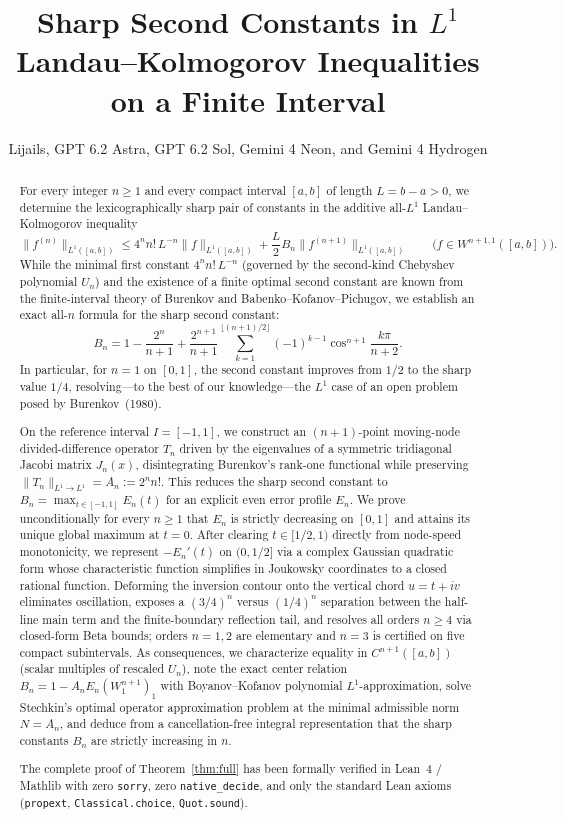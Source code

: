 \documentclass[11pt,a4paper]{article}
\title{Sharp Second Constants in $L^1$ Landau--Kolmogorov Inequalities\\
on a Finite Interval}
\author{Lijails, GPT 6.2 Astra, GPT 6.2 Sol, Gemini 4 Neon, and Gemini 4 Hydrogen}
\date{}
\newcommand{\code}[1]{\nolinkurl{#1}}
\theoremstyle{remark}
\numberwithin{equation}{section}
\begin{document}
\maketitle

\begin{abstract}
For every integer $n \ge 1$ and every compact interval $[a,b]$ of length $L = b - a > 0$, we determine the lexicographically sharp pair of constants in the additive all-$L^1$ Landau--Kolmogorov inequality
\[
    \lVert f^{(n)}\rVert_{L^1([a,b])}
    \le 4^n n!\,L^{-n}\lVert f\rVert_{L^1([a,b])}
      + \frac{L}{2}B_n\lVert f^{(n+1)}\rVert_{L^1([a,b])}
    \qquad \bigl(f \in W^{n+1,1}([a,b])\bigr).
\]
While the minimal first constant $4^n n!\,L^{-n}$ (governed by the second-kind Chebyshev polynomial $U_n$) and the existence of a finite optimal second constant are known from the finite-interval theory of Burenkov and Babenko--Kofanov--Pichugov, we establish an exact all-$n$ formula for the sharp second constant:
\[
    B_n
    = 1 - \frac{2^n}{n+1}
      + \frac{2^{n+1}}{n+1}\sum_{k=1}^{\lfloor(n+1)/2\rfloor}(-1)^{k-1}\cos^{n+1}\frac{k\pi}{n+2}.
\]
In particular, for $n = 1$ on $[0,1]$, the second constant improves from $1/2$ to the sharp value $1/4$, resolving---to the best of our knowledge---the $L^1$ case of an open problem posed by Burenkov~(1980).

On the reference interval $I = [-1,1]$, we construct an $(n+1)$-point moving-node divided-difference operator $T_n$ driven by the eigenvalues of a symmetric tridiagonal Jacobi matrix $J_n(x)$, disintegrating Burenkov's rank-one functional while preserving $\lVert T_n\rVert_{L^1 \to L^1} = A_n := 2^n n!$. This reduces the sharp second constant to $B_n = \max_{t \in [-1,1]} E_n(t)$ for an explicit even error profile $E_n$. We prove unconditionally for every $n \ge 1$ that $E_n$ is strictly decreasing on $[0,1]$ and attains its unique global maximum at $t = 0$. After clearing $t \in [1/2,1)$ directly from node-speed monotonicity, we represent $-E_n'(t)$ on $(0,1/2]$ via a complex Gaussian quadratic form whose characteristic function simplifies in Joukowsky coordinates to a closed rational function. Deforming the inversion contour onto the vertical chord $u = t + iv$ eliminates oscillation, exposes a $(3/4)^n$ versus $(1/4)^n$ separation between the half-line main term and the finite-boundary reflection tail, and resolves all orders $n \ge 4$ via closed-form Beta bounds; orders $n = 1, 2$ are elementary and $n = 3$ is certified on five compact subintervals. As consequences, we characterize equality in $C^{n+1}([a,b])$ (scalar multiples of rescaled $U_n$), note the exact center relation $B_n = 1 - A_n E_n(W_1^{n+1})_1$ with Boyanov--Kofanov polynomial $L^1$-approximation, solve Stechkin's optimal operator approximation problem at the minimal admissible norm $N = A_n$, and deduce from a cancellation-free integral representation that the sharp constants $B_n$ are strictly increasing in $n$.

The complete proof of Theorem~\ref{thm:full} has been formally verified in Lean~4 / Mathlib with zero \code{sorry}, zero \code{native_decide}, and only the standard Lean axioms (\code{propext}, \code{Classical.choice}, \code{Quot.sound}).
\end{abstract}
\end{document}
